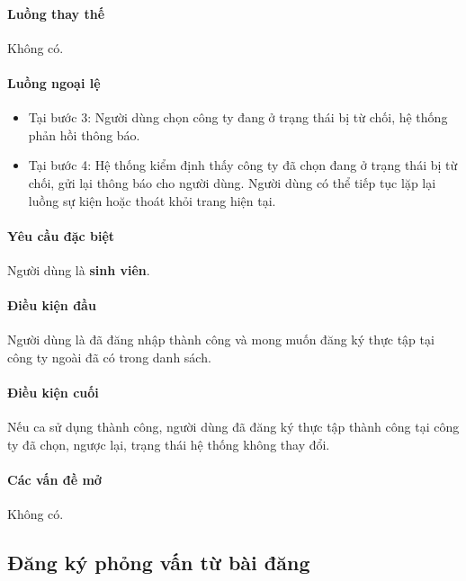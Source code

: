 \documentclass[./../main.tex]{subfiles}
\begin{document}
\paragraph*{Luồng thay thế} Không có.

\paragraph*{Luồng ngoại lệ}

\begin{itemize}
	\item

	      Tại bước 3: Người dùng chọn công ty đang ở trạng thái bị từ chối, hệ
	      thống phản hồi thông báo.

	\item

	      Tại bước 4: Hệ thống kiểm định thấy công ty đã chọn đang ở trạng thái
	      bị từ chối, gửi lại thông báo cho người dùng. Người dùng có thể tiếp
	      tục lặp lại luồng sự kiện hoặc thoát khỏi trang hiện tại.

\end{itemize}

\paragraph*{Yêu cầu đặc biệt}

Người dùng là \textbf{sinh viên}.

\paragraph*{Điều kiện đầu}

Người dùng là đã đăng nhập thành công và mong muốn đăng ký thực tập tại
công ty ngoài đã có trong danh sách.

\paragraph*{Điều kiện cuối}

Nếu ca sử dụng thành công, người dùng đã đăng ký thực tập thành công tại
công ty đã chọn, ngược lại, trạng thái hệ thống không thay đổi.

\paragraph*{Các vấn đề mở}

Không có.

\subsection{Đăng ký phỏng vấn từ bài đăng}
\end{document}
